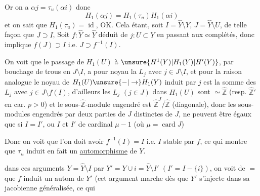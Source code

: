 Or on a $\alpha j=\tau_u(\alpha i)$ donc 
\[
H_1(\alpha j)=H_1(\tau_u)H_1(\alpha i)
\]
et on sait que $H_1(\tau_u)=\operatorname{id}$, OK. Cela étant, soit $I=\widehat Y\setminus Y$, $J=\widehat Y\setminus U$, de telle façon que $J\supset I$,  Soit $f:\widehat Y\simeq\widehat Y$ déduit de $j:U\subset Y$ en passant aux complétés, donc   implique $f(J)\supset I$ i.e. $J\supset f^{-1}(I)$.

On voit que le passage de $H_1(U)$ à $\unsure{H^1(Y)|H_1(Y)|H'(Y)}$, par bouchage de trous en $J\setminus I$, a pour noyau la  $L_j$ avec $j\in J\setminus I$, et pour la raison analogue le noyau de $H_1(U)\unsure{-|\to}H_1(Y)$ induit par $j$ est la somme des $L_j$ avec $j\in J\setminus f(I)$, d'ailleurs les $L_j$ $(j\in J)$ dans $H_1(U)$ sont $\simeq\widehat{\mathbb Z}$ (resp. $\widehat{\mathbb Z}'$ en car. $p>0$) et le sous-$\widehat{\mathbb Z}$-module engendré est $\widehat{\mathbb Z}^{J}/\widehat{\mathbb Z}$ (diagonale), donc  les sous-modules engendrés par deux parties  de $J$ distinctes de $J$, ne peuvent être égaux que si $I=I'$, ou $I$ et $I'$ de cardinal $\mu-1$ (où $\mu=\operatorname{card}J$)



 Donc on voit que l'on doit avoir $f^{-1}(I)=I$ i.e. $I$ stable par $f$, ce qui montre que $\tau_u$ induit en fait un \uline{automorphisme} de $Y$.


dans ces arguments $Y=\widehat Y\setminus I$ par $Y'=Y\cup i=\widehat Y\setminus I'$ $(I'=I-\{i\})$, on voit de $=$ que $f$ induit un autom de $Y'$ (cet argument marche dès que $Y'$ s'injecte dans sa jacobienne généralisée, ce qui  


